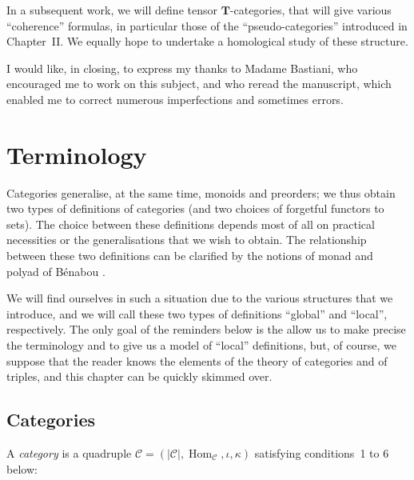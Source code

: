 \documentclass{article}
\newcommand{\oldpage}[1]{\marginpar{\footnotesize$\Big\vert$ \textit{p.~#1}}}
\newcommand{\TT}{\mathbf{T}}
\newcommand{\cat}[1]{\mathcal{#1}}
\newcommand{\set}[1]{|#1|}
\DeclareMathOperator{\Hom}{Hom}
\begin{document}
In a subsequent work, we will define tensor $\TT$-categories, that will give various ``coherence'' formulas, in particular those of the ``pseudo-categories'' introduced in Chapter~II.
We equally hope to undertake a homological study of these structure.

I would like, in closing, to express my thanks to Madame Bastiani, who encouraged me to work on this subject, and who reread the manuscript, which enabled me to correct numerous imperfections and sometimes errors.





\clearpage
\tableofcontents


\clearpage
\setcounter{section}{-1}
\section{Terminology}

\oldpage{219}

Categories generalise, at the same time, monoids and preorders;
we thus obtain two types of definitions of categories (and two choices of forgetful functors to sets).
The choice between these definitions depends most of all on practical necessities or the generalisations that we wish to obtain.
The relationship between these two definitions can be clarified by the notions of monad and polyad of Bénabou \cite{Be}.

We will find ourselves in such a situation due to the various structures that we introduce, and we will call these two types of definitions ``global'' and ``local'', respectively.
The only goal of the reminders below is the allow us to make precise the terminology and to give us a model of ``local'' definitions, but, of course, we suppose that the reader knows the elements of the theory of categories and of triples, and this chapter can be quickly skimmed over.


\subsection{Categories}

A \emph{category} is a quadruple $\cat{C}=(\set{\cat{C}}, \Hom_\cat{C}, \iota, \kappa)$ satisfying conditions~1 to 6 below:
\end{document}
